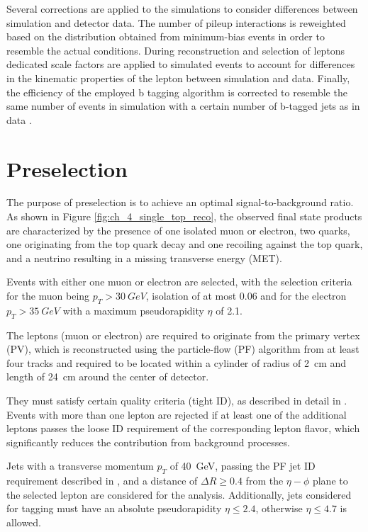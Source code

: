 Several corrections are applied to the simulations to consider differences between simulation and detector data. The number of pileup interactions is reweighted based on the distribution obtained from minimum-bias events in order to resemble the actual conditions. During reconstruction and selection of leptons dedicated scale factors are applied to simulated events to account for differences in the kinematic properties of the lepton between simulation and data. Finally, the efficiency of the employed b tagging algorithm is corrected to resemble the same number of events in simulation with a certain number of b-tagged jets as in data \cite{Fal18}.

\section{Preselection}
\label{sec:ch-5-preselection}
The purpose of preselection is to achieve an optimal signal-to-background ratio. As shown in Figure \ref{fig:ch_4_single_top_reco}, the observed final state products are characterized by the presence of one isolated muon or electron, two \Pbottom quarks, one originating from the top quark decay and one recoiling against the top quark, and a neutrino resulting in a missing transverse energy (MET).

Events with either one muon or electron are selected, with the selection criteria for the muon being $p_T > \SI{30}{GeV}$, isolation of at most 0.06 and for the electron $p_T > \SI{35}{GeV}$ with a maximum pseudorapidity $\eta$ of 2.1.

The leptons (muon or electron) are required to originate from the primary vertex (PV), which is reconstructed using the particle-flow (PF) algorithm from at least four tracks and required to be located within a cylinder of radius of \SI{2}{cm} and length of \SI{24}{cm} around the center of detector. 

They must satisfy certain quality criteria (tight ID), as described in detail in \cite{Fal18}. Events with more than one lepton are rejected if at least one of the additional leptons passes the loose ID requirement of the corresponding lepton flavor, which significantly reduces the contribution from background processes.

Jets with a transverse momentum $p_T$ of \SI{40}{GeV}, passing the PF jet ID requirement described in \cite{Fal18}, and a distance of $\Delta R \geq 0.4$ from the $\eta-\phi$ plane to the selected lepton are considered for the analysis. Additionally, jets considered for \Pbottom tagging must have an absolute pseudorapidity $\eta \leq 2.4$, otherwise $\eta \leq 4.7$ is allowed.

